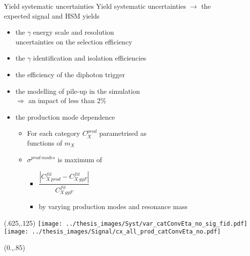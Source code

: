 \documentclass[10pt,UKenglish, leqno, xcolor = dvipsnames]{beamer}
\begin{document}
	\begin{frame}{Yield systematic uncertainties}
		\vfill
		Yield systematic uncertainties $\to$ the\\ expected signal and HSM yields
		\begin{itemize}
			\item the $\gamma$ energy scale and resolution\\ uncertainties on the selection efficiency
			\item the $\gamma$ identification and isolation efficiencies
			\item the efficiency of the diphoton trigger
			\item  the modelling of pile-up in the simulation\\
			\vspace{.1cm}
			$\Rightarrow$ an impact of less than 2\%
			\vspace{.1cm}
			\item the production mode dependence
			\begin{itemize}
				\item For each category $C_X^{prod}$ parametrised as\\ functions of $m_X$
				\item $\sigma^{prod\ modes}$ is maximum of
				\begin{itemize}
					\item $\dfrac{|C^{fit}_{X\ prod}-C^{fit}_{X\ ggF}|}{C^{fit}_{X\ ggF}}$
					\item by varying production modes and resonance mass
				\end{itemize}
			\end{itemize}
		\end{itemize}
		\vfill
		\begin{textblock}{1}(.625,.125)
			\texttt{[image: ../thesis\_images/Syst/var\_catConvEta\_no\_sig\_fid.pdf]}\\
			\texttt{[image: ../thesis\_images/Signal/cx\_all\_prod\_catConvEta\_no.pdf]}\\	
		\end{textblock}	
		
		\begin{textblock}{1}(0.,.85)
			\begin{figure}
			\end{figure}
		\end{textblock}
	\end{frame}
\end{document}
